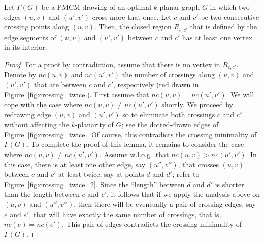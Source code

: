 \begin{lemma}
Let $\Gamma(G)$ be a PMCM-drawing of an optimal $k$-planar graph $G$ in which two edges $(u,v)$ and $(u',v')$ cross more that once. Let $c$ and $c'$ be two consecutive crossing points along $(u,v)$. Then, the closed region $R_{c,c'}$ that is defined by the edge segments of $(u,v)$ and $(u',v')$ between $c$ and $c'$ has at least one vertex in its interior.
\label{lem:crossing_twice}
\end{lemma}
\begin{proof}
For a proof by contradiction, assume that there is no vertex in $R_{c,c'}$. Denote by $nc(u,v)$ and $nc(u',v')$ the number of crossings along $(u,v)$ and $(u',v')$ that are between $c$ and $c'$, respectively (red drawn in Figure~\ref{fig:crossing_twice}). First assume that $nc(u,v) = nc(u',v')$. We will cope with the case where $nc(u,v) \neq nc(u',v')$ shortly. We proceed by redrawing edge $(u,v)$ and $(u',v')$ so to eliminate both crossings $c$ and $c'$ without affecting the $k$-planarity of $G$; see the dotted-drawn edges of Figure~\ref{fig:crossing_twice}. Of course, this contradicts the crossing minimality of $\Gamma(G)$. To complete the proof of this lemma, it remains to consider the case where $nc(u,v) \neq nc(u',v')$. Assume w.l.o.g.~that $nc(u,v) > nc(u',v')$. In this case, there is at least one other edge, say $(u'',v'')$, that crosses $(u,v)$ between $c$ and $c'$ at least twice, say at points $d$ and $d'$; refer to Figure~\ref{fig:crossing_twice_2}. Since the ``length'' between $d$ and $d'$ is shorter than the length between $c$ and $c'$, it follows that if we apply the analysis above on $(u,v)$ and $(u'',v'')$, then there will be eventually a pair of crossing edges, say $e$ and $e'$, that will have exactly the same number of crossings, that is, $nc(e) = nc(e')$. This pair of edges contradicts the crossing minimality of $\Gamma(G)$.    
\end{proof}
 
